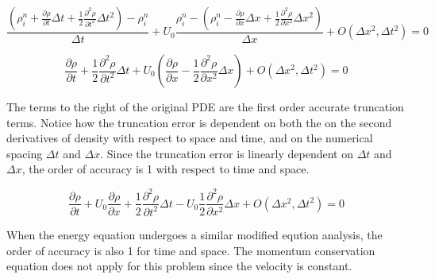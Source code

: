 \documentclass{mc2015}
\begin{document}
    \begin{equation}
    	\label{eq:MEA_start}
    	\frac{ \left( \rho_{i}^{n} + \frac{\partial \rho}{\partial t} \Delta t +
    	\frac{1}{2} \frac{\partial^2 \rho}{\partial t^2} \Delta t^2 \right)-\rho_{i}^{n} }{\Delta t} 
    	+ U_{0} \frac{\rho_{i}^{n} - \left( \rho_{i}^{n} -  \frac{\partial \rho}{\partial x} \Delta x + 
    	\frac{1}{2} \frac{\partial^2 \rho}{\partial x^2} \Delta x^2 \right)}{\Delta x} 
    	+ O(\Delta x^{2},\Delta t^{2}) 
    	= 0
    \end{equation}
    
    \begin{equation}
    	\label{eq:MEA_p0}
    	 \frac{\partial \rho}{\partial t}  + \frac{1}{2} \frac{\partial^2 \rho}{\partial t^2} \Delta t +
    	 U_{0} \left(   \frac{\partial \rho}{\partial x}  - \frac{1}{2} \frac{\partial^2 \rho}{\partial x^2} \Delta x \right) 
    	 + O(\Delta x^{2},\Delta t^{2}) 
    	 = 0
    \end{equation}
    
    The terms to the right of the original PDE are the first order accurate
    truncation terms. Notice how the truncation error is  dependent on both the
    on the second derivatives of density with respect to space and time, and on
    the numerical spacing $\Delta t$ and $\Delta x$. Since the truncation
    error is linearly dependent on $\Delta t$ and $\Delta x$, the order of
    accuracy is 1 with respect to time and space. 
    
    \begin{equation}
    	\label{eq:MEA_p1}
    	 \frac{\partial \rho}{\partial t}  +  U_{0} \frac{\partial \rho}{\partial x} + 
    	 \frac{1}{2} \frac{\partial^2 \rho}{\partial t^2} \Delta t -
    	   U_{0}  \frac{1}{2} \frac{\partial^2 \rho}{\partial x^2} \Delta x  
    	   + O(\Delta x^{2},\Delta t^{2}) = 0 
    \end{equation} 
    
    When the energy equation undergoes a similar modified eqution analysis, the
    order of accuracy is also 1 for time and space. The momentum conservation
    equation does not apply for this problem since the velocity is
    constant.
    
\end{document}
